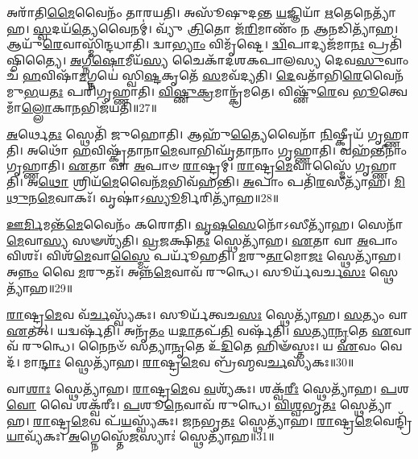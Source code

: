 𑌅𑌰𑌾᳴𑌤𑌿\-\ul{𑌮𑍈}\-𑌵𑍈𑌨𑌂᳴ 𑌤𑌾𑌰𑌯𑌤𑌿।
𑌅𑌸𑍂᳴𑌷𑍁𑌦𑌨𑍍𑌤 \ul{𑌯}\-𑌜𑍍𑌞𑌿𑌯𑌾᳴ \ul{𑌋}\-𑌤𑍇𑌨𑍇𑌤𑍍𑌯𑌾᳴𑌹।
\-\ul{𑌸𑍍𑌵}\-𑌦𑌯᳴\-\ul{𑌤𑍍𑌯𑍇}\-𑌵𑍈𑌨𑌮𑍍॑।
𑌵𑍍𑌯𑍁᳴ \ul{𑌤𑍍𑌰𑌿}\-𑌤𑍋 𑌜᳴\-\ul{𑌰𑌿}\-𑌮𑌾𑌣𑌂᳴ 𑌨 𑌆\-\ul{𑌨}\-𑌡𑌿𑌤𑍍𑌯𑌾᳴𑌹।
𑌆𑌯𑍁᳴\-\ul{𑌰𑍇}\-𑌵𑌾𑌸𑍍𑌮𑌿᳴𑌨𑍍𑌦𑌧𑌾𑌤𑌿।
𑌦𑍍𑌵𑌾\-\ul{𑌭𑍍𑌯𑌾𑌂} 𑌵𑌿𑌮𑍃᳴𑌷𑍍𑌟𑍇।
\-\ul{𑌦𑍍𑌵𑌿}\-𑌪𑌾𑌦𑍍𑌯𑌜᳴𑌮𑌾\-\ul{𑌨𑌃} 𑌪𑍍𑌰𑌤𑌿᳴\-𑌷𑍍𑌠𑌿𑌤𑍍𑌯𑍈।
\-\ul{𑌅}\-\-\ul{𑌗𑍍𑌨𑍀}\-\-\ul{𑌷𑍋}\-𑌮𑍀𑌯᳴\-\ul{𑌸𑍍𑌯} 𑌚𑍈𑌕𑌾᳴\-𑌦𑌶\-𑌕𑌪𑌾𑌲𑌸𑍍𑌯 𑌦𑍇𑌵\-\ul{𑌸𑍁}\-𑌵𑌾𑌂 𑌚᳴ \ul{𑌹}\-𑌵𑌿𑌷𑌾᳴\-\ul{𑌮}\-𑌗𑍍𑌨𑌯𑍇॑ 𑌸𑍍𑌵𑌿\-\ul{𑌷𑍍𑌟}\-𑌕𑍃𑌤𑍇᳴ \ul{𑌸}\-𑌮𑌵᳴𑌦𑍍𑌯𑌤𑌿।
\-\ul{𑌦𑍇}\-𑌵𑌤𑌾᳴𑌭𑌿\-\ul{𑌰𑍇}\-𑌵𑍈𑌨᳴𑌮𑍁\-\ul{𑌭}\-𑌯\-\ul{𑌤𑌃} 𑌪𑌰𑌿᳴𑌗𑍃𑌹𑍍𑌣𑌾𑌤𑌿।
\-\ul{𑌵𑌿}\-\-\ul{𑌷𑍍𑌣𑍁}\-\-\ul{𑌕𑍍𑌰}\-𑌮𑌾𑌨𑍍𑌕𑍍𑌰᳴𑌮𑌤𑍇।
𑌵𑌿𑌷𑍍𑌣𑍁᳴\-\ul{𑌰𑍇}\-𑌵 \ul{𑌭𑍂}\-𑌤𑍍𑌵𑍇𑌮𑌾𑌁\-\ul{𑌲𑍍𑌲𑍋}\-𑌕𑌾\-\ul{𑌨}\-𑌭𑌿\-𑌜᳴𑌯𑌤𑌿॥27॥\anuvakamend[\-\ul{𑌸}\-𑌤𑍍𑌯𑌾𑌨𑌾᳴𑌮\-\ul{𑌧𑌾}\-𑌯𑍀𑌤𑍍𑌯𑌾᳴𑌹𑌾𑌤𑌾\-\ul{𑌰𑍀}\-𑌦𑌿𑌤𑍍𑌯𑌾᳴𑌹 𑌕𑍍𑌰𑌮\-\ul{𑌤} 𑌏𑌕𑌂᳴ 𑌚]

\-\ul{𑌅}\-𑌰𑍍𑌥𑍇\-\ul{𑌤𑌃} 𑌸𑍍𑌥𑍇𑌤𑌿᳴ 𑌜𑍁𑌹𑍋𑌤𑌿।
𑌆𑌹𑍁᳴\-\ul{𑌤𑍍𑌯𑍈}\-𑌵𑍈𑌨𑌾᳴ \ul{𑌨𑌿}\-𑌷𑍍𑌕𑍍𑌰𑍀𑌯᳴ 𑌗𑍃𑌹𑍍𑌣𑌾𑌤𑌿।
𑌅𑌥𑍋᳴ \ul{𑌹}\-𑌵𑌿𑌷𑍍𑌕𑍃᳴𑌤𑌾𑌨𑌾\-\ul{𑌮𑍇}\-𑌵𑌾𑌭𑌿𑌘𑍃᳴𑌤𑌾𑌨𑌾𑌂 𑌗𑍃𑌹𑍍𑌣𑌾𑌤𑌿।
𑌵𑌹᳴𑌨𑍍𑌤𑍀𑌨𑌾𑌂 𑌗𑍃𑌹𑍍𑌣𑌾𑌤𑌿।
\-\ul{𑌏}\-𑌤𑌾 𑌵𑌾 \ul{𑌅}\-𑌪𑌾𑍞 \ul{𑌰𑌾}\-𑌷𑍍𑌟𑍍𑌰𑌮𑍍।
\-\ul{𑌰𑌾}\-𑌷𑍍𑌟𑍍𑌰\-\ul{𑌮𑍇}\-𑌵𑌾𑌸𑍍𑌮𑍈᳴ 𑌗𑍃𑌹𑍍𑌣𑌾𑌤𑌿।
𑌅\-\ul{𑌥𑍋} 𑌶𑍍𑌰𑌿𑌯᳴\-\ul{𑌮𑍇}\-𑌵𑍈𑌨᳴\-\ul{𑌮}\-𑌭𑌿𑌵᳴𑌹𑌨𑍍𑌤𑌿।
\-\ul{𑌅}\-𑌪𑌾𑌂 𑌪𑌤𑌿᳴\-\ul{𑌰}\-𑌸𑍀𑌤𑍍𑌯𑌾᳴𑌹।
\-\ul{𑌮𑌿}\-\-\ul{𑌥𑍁}\-𑌨\-\ul{𑌮𑍇}\-𑌵𑌾𑌕𑌃᳴।
𑌵𑍃𑌷𑌾॑\-𑌽\-\ul{𑌸𑍍𑌯𑍂}\-𑌰𑍍𑌮𑌿𑌰𑌿𑌤𑍍𑌯𑌾᳴𑌹॥28॥

\-\ul{𑌊}\-\-\ul{𑌰𑍍𑌮𑌿}\-𑌮𑌨𑍍𑌤᳴\-\ul{𑌮𑍇}\-𑌵𑍈𑌨𑌂᳴ 𑌕𑌰𑍋𑌤𑌿।
\-\ul{𑌵𑍃}\-\-\ul{𑌷}\-\-\ul{𑌸𑍇}\-𑌨𑍋᳴\-𑌽𑌸𑍀𑌤𑍍𑌯𑌾᳴𑌹।
𑌸𑍇𑌨𑌾᳴\-\ul{𑌮𑍇}\-𑌵𑌾\-\ul{𑌸𑍍𑌯} 𑌸𑍟𑌶𑍍𑌯᳴𑌤𑌿।
\-\ul{𑌵𑍍𑌰}\-\-\ul{𑌜}\-𑌕𑍍𑌷𑌿\-\ul{𑌤𑌃} 𑌸𑍍𑌥𑍇𑌤𑍍𑌯𑌾᳴𑌹।
\-\ul{𑌏}\-𑌤𑌾 𑌵𑌾 \ul{𑌅}\-𑌪𑌾𑌂 𑌵𑌿𑌶𑌃᳴।
𑌵𑌿𑌶᳴\-\ul{𑌮𑍇}\-𑌵𑌾\-\ul{𑌸𑍍𑌮𑍈} 𑌪𑌰𑍍𑌯𑍂᳴𑌹𑌤𑌿।
\-\ul{𑌮}\-𑌰𑍁\-\ul{𑌤𑌾}\-𑌮𑍋\-\ul{𑌜𑌃} 𑌸𑍍𑌥𑍇𑌤𑍍𑌯𑌾᳴𑌹।
𑌅\-\ul{𑌨𑍍𑌨𑌂} 𑌵𑍈 \ul{𑌮}\-𑌰𑍁𑌤𑌃᳴।
𑌅𑌨𑍍𑌨᳴\-\ul{𑌮𑍇}\-𑌵𑌾𑌵᳴ 𑌰𑍁𑌨𑍍𑌧𑍇।
𑌸𑍂𑌰𑍍𑌯᳴𑌵𑌰𑍍𑌚\-\ul{𑌸𑌃} 𑌸𑍍𑌥𑍇𑌤𑍍𑌯𑌾᳴𑌹॥29॥

\-\ul{𑌰𑌾}\-𑌷𑍍𑌟𑍍𑌰\-\ul{𑌮𑍇}\-𑌵 𑌵᳴\-\ul{𑌰𑍍𑌚}\-𑌸𑍍𑌵𑍍𑌯᳴𑌕𑌃।
𑌸𑍂𑌰𑍍𑌯᳴𑌤𑍍𑌵𑌚\-\ul{𑌸𑌃} 𑌸𑍍𑌥𑍇𑌤𑍍𑌯𑌾᳴𑌹।
\-\ul{𑌸}\-𑌤𑍍𑌯𑌂 𑌵𑌾 \ul{𑌏}\-𑌤𑌤𑍍।
𑌯𑌦𑍍𑌵𑌰𑍍\mbox{}𑌷᳴𑌤𑌿।
𑌅𑌨𑍃᳴\-\ul{𑌤𑌂} 𑌯\-\ul{𑌦𑌾}\-𑌤𑌪᳴\-\ul{𑌤𑌿} 𑌵𑌰𑍍\mbox{}𑌷᳴𑌤𑌿।
\-\ul{𑌸}\-\-\ul{𑌤𑍍𑌯𑌾}\-\-\ul{𑌨𑍃}\-𑌤𑍇 \ul{𑌏}\-𑌵𑌾𑌵᳴ 𑌰𑍁𑌨𑍍𑌧𑍇।
𑌨𑍈𑌨𑍞᳴ 𑌸𑌤𑍍𑌯𑌾\-\ul{𑌨𑍃}\-𑌤𑍇 𑌉᳴\-\ul{𑌦𑌿}\-𑌤𑍇 𑌹𑌿𑍟᳴𑌸𑍍𑌤𑌃।
𑌯 \ul{𑌏}\-𑌵𑌂 𑌵𑍇𑌦᳴।
𑌮𑌾\-\ul{𑌨𑍍𑌦𑌾𑌃} 𑌸𑍍𑌥𑍇𑌤𑍍𑌯𑌾᳴𑌹।
\-\ul{𑌰𑌾}\-𑌷𑍍𑌟𑍍𑌰\-\ul{𑌮𑍇}\-𑌵 𑌬𑍍𑌰᳴𑌹𑍍𑌮𑌵\-\ul{𑌰𑍍𑌚}\-𑌸𑍍𑌯᳴𑌕𑌃॥30॥

𑌵𑌾\-\ul{𑌶𑌾𑌃} 𑌸𑍍𑌥𑍇𑌤𑍍𑌯𑌾᳴𑌹।
\-\ul{𑌰𑌾}\-𑌷𑍍𑌟𑍍𑌰\-\ul{𑌮𑍇}\-𑌵 \ul{𑌵}\-𑌶𑍍𑌯᳴𑌕𑌃।
𑌶𑌕𑍍𑌵᳴\-\ul{𑌰𑍀𑌃} 𑌸𑍍𑌥𑍇𑌤𑍍𑌯𑌾᳴𑌹।
\-\ul{𑌪}\-𑌶\-\ul{𑌵𑍋} 𑌵𑍈 𑌶𑌕𑍍𑌵᳴𑌰𑍀𑌃।
\-\ul{𑌪}\-𑌶𑍂\-\ul{𑌨𑍇}\-𑌵𑌾𑌵᳴ 𑌰𑍁𑌨𑍍𑌧𑍇।
\-\ul{𑌵𑌿}\-\-\ul{𑌶𑍍𑌵}\-𑌭𑍃\-\ul{𑌤𑌃} 𑌸𑍍𑌥𑍇𑌤𑍍𑌯𑌾᳴𑌹।
\-\ul{𑌰𑌾}\-𑌷𑍍𑌟𑍍𑌰\-\ul{𑌮𑍇}\-𑌵 𑌪᳴\-\ul{𑌯}\-𑌸𑍍𑌵𑍍𑌯᳴𑌕𑌃।
\-\ul{𑌜}\-\-\ul{𑌨}\-𑌭𑍃\-\ul{𑌤𑌃} 𑌸𑍍𑌥𑍇𑌤𑍍𑌯𑌾᳴𑌹।
\-\ul{𑌰𑌾}\-𑌷𑍍𑌟𑍍𑌰\-\ul{𑌮𑍇}\-𑌵𑍇𑌨𑍍𑌦𑍍𑌰𑌿᳴\-\ul{𑌯𑌾}\-𑌵𑍍𑌯᳴𑌕𑌃।
\-\ul{𑌅}\-𑌗𑍍𑌨𑍇𑌸𑍍𑌤𑍇᳴\-\ul{𑌜}\-𑌸𑍍𑌯𑌾𑌃॑ 𑌸𑍍𑌥𑍇𑌤𑍍𑌯𑌾᳴𑌹॥31॥

